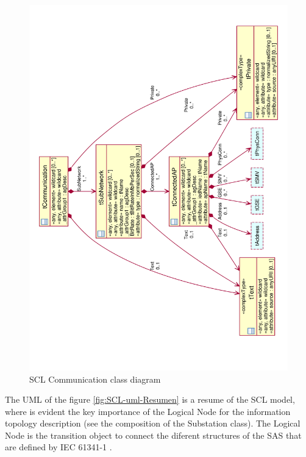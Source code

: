 \begin{landscape}
	\begin{figure}
	  \includegraphics[angle=-90, width=1.0\linewidth]{chapters/ch-scl/figures/SCL-uml-communication-Deept3}
	  \caption{SCL Communication class diagram}  
	  \label{fig:pdf-SCL-uml-communication-Deept3}
	\end{figure}
\end{landscape}


The UML of the 
figure \ref{fig:SCL-uml-Resumen} 
is a resume of
the SCL model, where is evident the 
key importance of the Logical Node for  
the information topology description (see 
the composition of the Substation 
class). The Logical Node is  
the transition object to 
connect the diferent structures of the SAS 
that are defined by IEC 61341-1 \cite{IEC61346-1:1996}.


